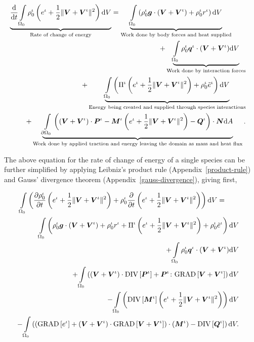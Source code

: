 \begin{eqnarray}
\underbrace{\frac{\mathrm{d}}{\mathrm{d}t}
  \int\limits_{\Omega_0}\rho_0^\iota \left ( e^\iota + \frac{1}{2}
  \Vert\mbox{\boldmath$ V$}+\mbox{\boldmath$ V$}^\iota\Vert^2 \right ) \mathrm{d}V}_{\text{Rate of
    change of energy}} = \underbrace{\int\limits_{\Omega_0}
  \left(\rho_0^\iota\mbox{\boldmath$ g$} \cdot\left(\mbox{\boldmath$ V$}+\mbox{\boldmath$ V$}^\iota\right) + \rho_0^\iota
  r^\iota \right)\mathrm{d}V}_{\text{Work done by body forces and heat
    supplied}}\qquad& &\nonumber\\ +\underbrace{\int\limits_{\Omega_0}
  \rho_0^\iota\mbox{\boldmath$ q$}^\iota\cdot(\mbox{\boldmath$ V$} + \mbox{\boldmath$ V$}^\iota) \mathrm{d}V}_{\text{Work
    done by interaction forces}}& &\nonumber\\ +
\underbrace{\int\limits_{\Omega_0} \left(\Pi^\iota\left(e^\iota +
  \frac{1}{2}\Vert\mbox{\boldmath$ V$}+\mbox{\boldmath$ V$}^\iota\Vert^2\right) +
  \rho^\iota_0\tilde{e}^\iota\right)\mathrm{d}V}_{\text{Energy being
    created and supplied through species interactions}} & & \nonumber
\\ + \underbrace{\int\limits_{\partial \Omega_0}
  \left(\left(\mbox{\boldmath$ V$}+\mbox{\boldmath$ V$}^\iota\right)\cdot\mbox{\boldmath$ P$}^\iota -
  \mbox{\boldmath$ M$}^\iota\left(e^\iota +\frac{1}{2} \Vert\mbox{\boldmath$ V$}+\mbox{\boldmath$ V$}^\iota\Vert^2\right)
  - \mbox{\boldmath$ Q$}^\iota\right)\cdot\mbox{\boldmath$ N$}\mathrm{d}A}_{\text{Work done by applied
    traction and energy leaving the domain as mass and heat flux}}.
\label{globalbalanceofenergy}
\end{eqnarray}

The above equation for the rate of change of energy of a single
species can be further simplified by applying Leibniz's product rule
(Appendix~\ref{product-rule}) and Gauss' divergence theorem
(Appendix~\ref{gauss-divergence}), giving first,

\begin{eqnarray}
\int\limits_{\Omega_0}\left(\frac{\partial\rho_0^\iota}{\partial t}
\left(e^\iota + \frac{1}{2}\Vert\mbox{\boldmath$ V$}+\mbox{\boldmath$ V$}^\iota\Vert^2 \right) +
\rho^\iota_0\frac{\partial}{\partial t}\left(e^\iota +
\frac{1}{2}\Vert\mbox{\boldmath$ V$}+\mbox{\boldmath$ V$}^\iota\Vert^2 \right)\right) \mathrm{d}V
=\qquad & &\nonumber\\ \int\limits_{\Omega_0} \left(\rho_0^\iota\mbox{\boldmath$ g$}
\cdot\left(\mbox{\boldmath$ V$}+\mbox{\boldmath$ V$}^\iota\right) + \rho_0^\iota r^\iota +
\Pi^\iota\left(e^\iota + \frac{1}{2}\Vert\mbox{\boldmath$ V$}+\mbox{\boldmath$ V$}^\iota\Vert^2\right) +
\rho^\iota_0\tilde{e}^\iota\right)\mathrm{d}V& & \nonumber
\\ +\int\limits_{\Omega_0}\rho_0^\iota\mbox{\boldmath$ q$}^\iota\cdot(\mbox{\boldmath$ V$}+\mbox{\boldmath$ V$}^\iota)
\mathrm{d}V& &\nonumber\\ +\int\limits_{\Omega_0}
\left(\left(\mbox{\boldmath$ V$}+\mbox{\boldmath$ V$}^\iota\right)
\cdot\mathrm{DIV}\left[\mbox{\boldmath$ P$}^\iota\right] + \mbox{\boldmath$ P$}^\iota\colon\mathrm{GRAD}
\left[\mbox{\boldmath$ V$}+\mbox{\boldmath$ V$}^\iota\right]\right) \mathrm{d}V& &\nonumber\\ -
\int\limits_{\Omega_0}\left(\mathrm{DIV}\left[\mbox{\boldmath$ M$}^\iota\right]
\left(e^\iota +\frac{1}{2}
\Vert\mbox{\boldmath$ V$}+\mbox{\boldmath$ V$}^\iota\Vert^2\right)\right)\mathrm{d}V &
&\nonumber\\ -\int\limits_{\Omega_0}\left(
\left(\mathrm{GRAD}\left[e^\iota\right]+ \left(\mbox{\boldmath$ V$}+\mbox{\boldmath$ V$}^\iota\right)
\cdot \mathrm{GRAD}\left[\mbox{\boldmath$ V$}+\mbox{\boldmath$ V$}^\iota\right]\right)
\cdot\left(\mbox{\boldmath$ M$}^\iota\right) -
\mathrm{DIV}\left[\mbox{\boldmath$ Q$}^\iota\right]\right)\mathrm{d}V.\nonumber
\end{eqnarray}

